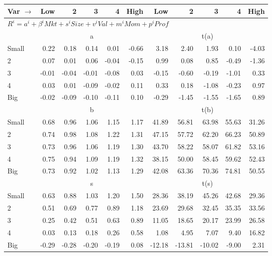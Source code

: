 
\begin{tabular}{lrrrrrrrrrr}
  \toprule
    
    Var $\rightarrow$ & Low & 2 & 3 & 4 & High & Low & 2 & 3 & 4 & High  \\ 
  \midrule
  \multicolumn{11}{l}{$R^i=a^i+\beta^iMkt+s^iSize+v^iVal+m^iMom+p^iProf$}  \\
  
     & \multicolumn{5}{c}{a} & \multicolumn{5}{c}{t(a)}   \\
     \cmidrule(r){2-6} \cmidrule(r){7-11} 
    Small  & 0.22  & 0.18  & 0.14  & 0.01  & -0.66  & 3.18  & 2.40  & 1.93  & 0.10  & -4.03   \\
    2  & 0.07  & 0.01  & 0.06  & -0.04  & -0.15  & 0.99  & 0.08  & 0.85  & -0.49  & -1.36   \\
    3  & -0.01  & -0.04  & -0.01  & -0.08  & 0.03  & -0.15  & -0.60  & -0.19  & -1.01  & 0.33   \\
    4  & 0.03  & 0.01  & -0.09  & -0.02  & 0.11  & 0.33  & 0.18  & -1.08  & -0.23  & 0.97   \\
    Big  & -0.02  & -0.09  & -0.10  & -0.11  & 0.10  & -0.29  & -1.45  & -1.55  & -1.65  & 0.89   \\
    
  
     & \multicolumn{5}{c}{b} & \multicolumn{5}{c}{t(b)}   \\
     \cmidrule(r){2-6} \cmidrule(r){7-11} 
    Small  & 0.68  & 0.96  & 1.06  & 1.15  & 1.17  & 41.89  & 56.81  & 63.98  & 55.63  & 31.26   \\
    2  & 0.74  & 0.98  & 1.08  & 1.22  & 1.31  & 47.15  & 57.72  & 62.20  & 66.23  & 50.89   \\
    3  & 0.73  & 0.96  & 1.06  & 1.19  & 1.30  & 43.70  & 58.22  & 58.07  & 61.82  & 53.16   \\
    4  & 0.75  & 0.94  & 1.09  & 1.19  & 1.32  & 38.15  & 50.00  & 58.45  & 59.62  & 52.43   \\
    Big  & 0.73  & 0.92  & 1.02  & 1.13  & 1.29  & 42.08  & 63.36  & 70.36  & 74.81  & 50.55   \\
    
  
     & \multicolumn{5}{c}{s} & \multicolumn{5}{c}{t(s)}   \\
     \cmidrule(r){2-6} \cmidrule(r){7-11} 
    Small  & 0.63  & 0.88  & 1.03  & 1.20  & 1.50  & 28.36  & 38.19  & 45.26  & 42.68  & 29.36   \\
    2  & 0.51  & 0.69  & 0.77  & 0.89  & 1.18  & 23.69  & 29.68  & 32.45  & 35.35  & 33.56   \\
    3  & 0.25  & 0.42  & 0.51  & 0.63  & 0.89  & 11.05  & 18.65  & 20.17  & 23.99  & 26.58   \\
    4  & 0.03  & 0.13  & 0.18  & 0.26  & 0.58  & 1.08  & 4.95  & 7.07  & 9.40  & 16.82   \\
    Big  & -0.29  & -0.28  & -0.20  & -0.19  & 0.08  & -12.18  & -13.81  & -10.02  & -9.00  & 2.31   \\
    

\end{tabular}
